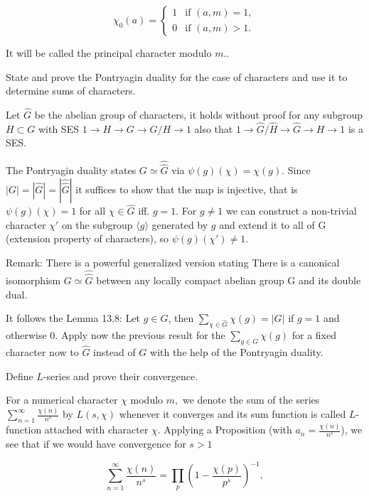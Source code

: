 \[
\chi_0(a) = 
\begin{cases}
    1 & \text{if } (a, m) = 1, \\
    0 & \text{if } (a, m) > 1.
\end{cases}
\]

It will be called the principal character modulo \(m.\).


State and prove the Pontryagin duality for the case of characters
and use it to determine sums of characters. 

Let \( \hat{G} \) be the abelian group of characters, it holds without proof 
for any subgroup \( H \subset G \) with SES \( 1 \longrightarrow H \longrightarrow G \longrightarrow G/H \longrightarrow 1 \)
also that \( 1 \longrightarrow \hat{G}/\hat{H} \longrightarrow \hat{G} \longrightarrow {H} \longrightarrow 1 \) is a SES.

The Pontryagin duality states \( G \simeq \hat{\hat{G}} \) via \(\psi(g)(\chi) = \chi(g) \).
Since \( |G| = |\hat{G}| = |\hat{\hat{G}}| \) it suffices to show that the map is injective, that is 
\( \psi(g)(\chi) = 1 \) for all \( \chi \in \hat{G} \) iff. \( g = 1 \).
For \( g \neq 1 \) we can construct  a non-trivial character \( \chi' \) on the subgroup \( \langle g \rangle \) generated by \( g \)
and extend it to all of G (extension property of characters), so \( \psi(g)(\chi') \neq 1 \).

Remark: There is a powerful generalized version stating
There is a canonical isomorphism \( G \simeq \hat{\hat{G}}\) between any locally compact abelian group G
and its double dual.

It follows the Lemma 13.8:
Let \( g \in G \), then \( \sum_{\chi \in \hat{G}} \chi(g) = |G| \) if \( g = 1 \) and otherwise \( 0 \).
Apply now the previous result for the \( \sum_{g \in G} \chi(g) \) for a fixed character now to \( \hat{G} \) instead of \( G \)
with the help of the Pontryagin duality.


Define \( L \)-series and prove their convergence.

For a numerical character \(\chi\) modulo \(m,\) we denote the sum of the series \(\sum_{n=1}^{\infty} \frac{\chi(n)}{n^s}\) by \(L(s, \chi)\) 
whenever it converges and its sum function is called \(L\)-function attached with character \(\chi.\) 
Applying a Proposition (with \(a_n = \frac{\chi(n)}{n^s}\)), we see that if we would have convergence for \(s > 1\)

\[
\sum_{n=1}^{\infty} \frac{\chi(n)}{n^s} = \prod_{p}\left(1 - \frac{\chi(p)}{p^s}\right)^{-1},
\]

